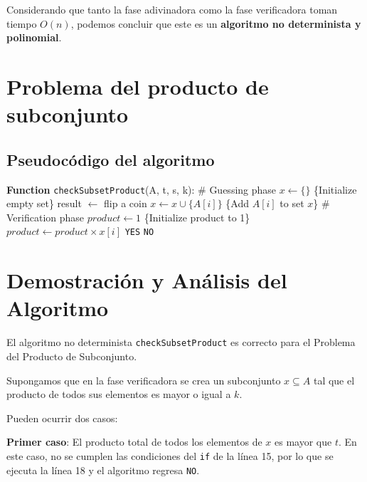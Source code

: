 \documentclass[12pt]{article}
\begin{document}
Considerando que tanto la fase adivinadora como la fase verificadora toman tiempo $O(n)$, podemos concluir que este es un \textbf{algoritmo no determinista y polinomial}.


\section{Problema del producto de subconjunto}

\subsection{Pseudocódigo del algoritmo}

\begin{algorithm}[H]
    \caption{\texttt{checkSubsetProduct} Function}
    \begin{algorithmic}[1]
    \STATE \textbf{Function} \texttt{checkSubsetProduct}(A, t, s, k):
    \STATE \# Guessing phase
    \STATE $x \gets \{\}$ \{Initialize empty set\}
        \STATE result $\gets$ flip a coin
            \STATE $x \gets x \cup \{A[i]\}$ \{Add $A[i]$ to set $x$\}
        \ENDIF
    \ENDFOR
    \STATE \# Verification phase
    \STATE $product \gets 1$ \{Initialize product to 1\}
        \STATE $product \gets product \times x[i]$
    \ENDFOR
        \RETURN \texttt{YES}
    \ENDIF
    \RETURN \texttt{NO}
    \end{algorithmic}
\end{algorithm}
    

\section{Demostración y Análisis del Algoritmo}

El algoritmo no determinista \texttt{checkSubsetProduct} es correcto para el Problema del Producto de Subconjunto.

Supongamos que en la fase verificadora se crea un subconjunto $x \subseteq A$ tal que el producto de todos sus elementos es mayor o igual a $k$.

Pueden ocurrir dos casos:

     \textbf{Primer caso}: El producto total de todos los elementos de $x$ es mayor que $t$. En este caso, no se cumplen las condiciones del \texttt{if} de la línea 15, por lo que se ejecuta la línea 18 y el algoritmo regresa \texttt{NO}.
     
\end{document}
